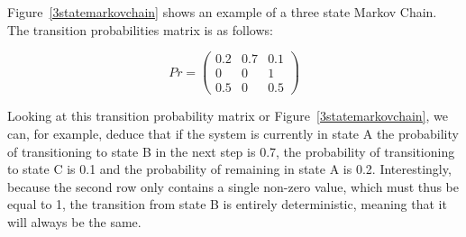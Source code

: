 Figure~\ref{3statemarkovchain} shows an example of a three state Markov Chain. The transition probabilities matrix is as follows:

\[
Pr =
 \begin{pmatrix}
  0.2 & 0.7 & 0.1 \\
  0 & 0 & 1 \\
  0.5 & 0 & 0.5
 \end{pmatrix}
\]

Looking at this transition probability matrix or Figure~\ref{3statemarkovchain}, we can, for example, deduce that if the system is currently in state A the probability of transitioning to state B in the next step is 0.7, the probability of transitioning to state C is 0.1 and the probability of remaining in state A is 0.2. Interestingly, because the second row only contains a single non-zero value, which must thus be equal to 1, the transition from state B is entirely deterministic, meaning that it will always be the same.




